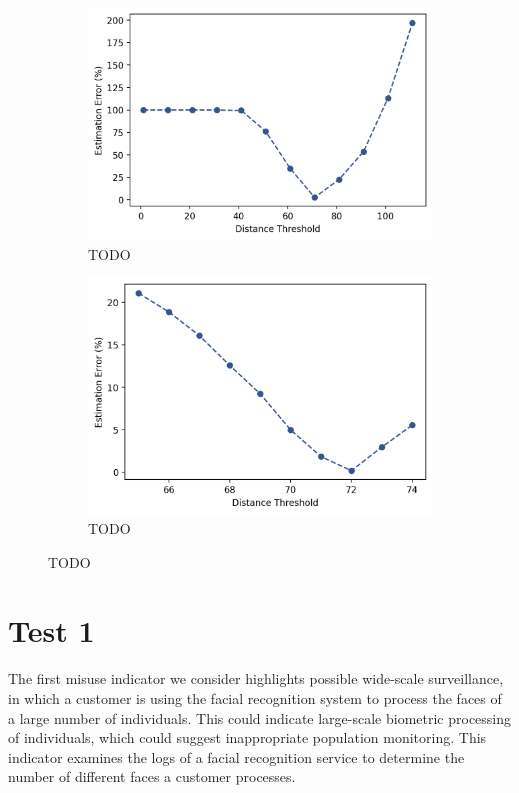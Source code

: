 \documentclass[a4paper,12pt]{report}
\begin{document}
\begin{figure}[ht]
\begin{subfigure}{.5\textwidth}
  \centering
  \includegraphics[width=.9\linewidth]{images/face/cw-parameter-estimation-1.png}  
  \caption{TODO}
  \label{fig:cw-sub-first}
\end{subfigure}
\begin{subfigure}{.5\textwidth}
  \centering
  \includegraphics[width=.9\linewidth]{images/face/cw-parameter-estimation-2.png}  
  \caption{TODO}
  \label{fig:cw-sub-second}
\end{subfigure}
\caption{TODO}
\label{fig:cw12}
\end{figure}

\section{Test 1}
The first misuse indicator we consider highlights possible wide-scale surveillance, in which a customer is using the facial recognition system to process the faces of a large number of individuals. This could indicate large-scale biometric processing of individuals, which could suggest inappropriate population monitoring. This indicator examines the logs of a facial recognition service to determine the number of different faces a customer processes.
\end{document}
